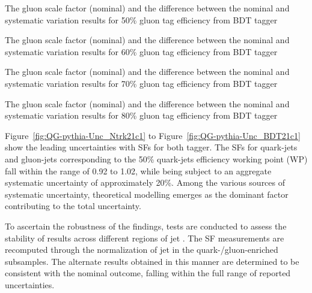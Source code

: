 \begin{table}[thp]
\centering
\caption{The gluon scale factor (nominal) and the difference between the nominal and systematic variation results for 50\% gluon tag efficiency from BDT tagger  }
\label{tab:Gluon0.5-bdt}
\end{table}{}

\begin{table}[thp]
\centering
\caption{The gluon scale factor (nominal) and the difference between the nominal and systematic variation results for 60\% gluon tag efficiency from BDT tagger  }
\label{tab:Gluon0.6-bdt}
\end{table}{}

\begin{table}[thp]
\centering
\caption{The gluon scale factor (nominal) and the difference between the nominal and systematic variation results for 70\% gluon tag efficiency from BDT tagger  }
\label{tab:Gluon0.7-bdt}
\end{table}{}

\begin{table}[thp]
\centering
\caption{The gluon scale factor (nominal) and the difference between the nominal and systematic variation results for 80\% gluon tag efficiency from BDT tagger  }
\label{tab:Gluon0.8-bdt}
\end{table}{}
\FloatBarrier


Figure~\ref{fig:QG-pythia-Unc_Ntrk21c1} to Figure~\ref{fig:QG-pythia-Unc_BDT21c1} show the leading uncertainties with SFs for both tagger.
The SFs for quark-jets and gluon-jets corresponding to the 50\% quark-jets efficiency working point (WP) fall within the range of 0.92 to 1.02, while being subject to an aggregate systematic uncertainty of approximately 20\%. Among the various sources of systematic uncertainty, theoretical modelling emerges as the dominant factor contributing to the total uncertainty.

To ascertain the robustness of the findings, tests are conducted to assess the stability of results across different regions of jet \abseta. The SF measurements are recomputed through the normalization of jet \abseta in the quark-/gluon-enriched subsamples. The alternate results obtained in this manner are determined to be consistent with the nominal outcome, falling within the full range of reported uncertainties.

